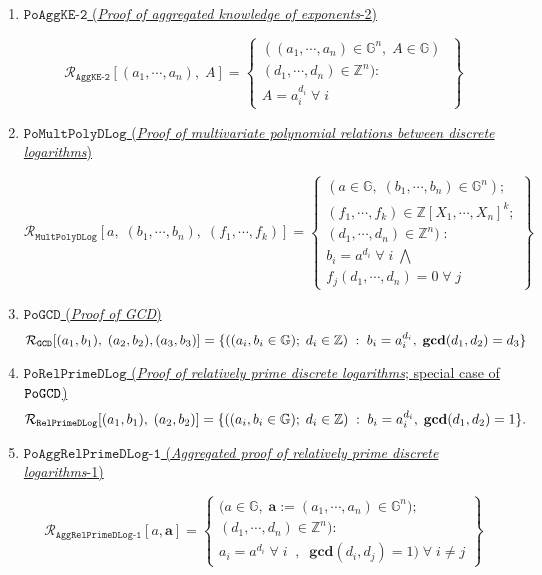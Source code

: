 \documentclass[11pt, lettersize, notitlepage, leqno, footskip=0.6cm]{article}
\newcommand{\bz}{\mathbb Z}
\newcommand{\ttt}{\texttt}
\newcommand{\mc}{\mathcal}
\newcommand{\mb}{\mathbb}
\newcommand{\mbf}{\mathbf}
\newcommand{\vs}{\vspace{-0.15cm}}
\newcommand{\GCD}{\mbf{gcd}}
\numberwithin{equation}{section}
\begin{document}
{{{\begin{enumerate}[wide, labelwidth=!, labelindent=0pt]
\item \hyperlink{AggKE-2}{$\ttt{PoAggKE-2}$ (\textit{Proof of aggregated knowledge of exponents}-2)} \vspace{-0.3cm}

\[
  \mc{R}_{{\ttt{AggKE-2}}}[(a_1,\cdots, a_n),\;A] = \left\{\begin{array}{l}
    ((a_1,\cdots, a_n)\in \mb{G}^n,\; A\in\mb{G})\;\\ 
    (d_1,\cdots,d_n)\in\bz^n) :  \\
     A = a_i^{d_i}\;\forall\;  i
  \end{array}\right\}
\]

\item \hyperlink{Mult}{$\ttt{PoMultPolyDLog}$ (\textit{Proof of multivariate polynomial relations between discrete logarithms})}\vspace{-0.6cm}

\[
  \mc{R}_{\ttt{MultPolyDLog}}[a,\; (b_1,\cdots, b_n),\; (f_1,\cdots,f_k)] = \left\{\begin{array}{l}
    (a\in\mb{G},\; (b_1,\cdots, b_n)\in\mb{G}^n);\\
    (f_1,\cdots,f_k)\in\bz[X_1,\cdots,X_n]^k;\\ 
    (d_1,\cdots,d_n)\in\bz^n)\;: \\
    b_i = a^{d_i}\;\forall\; i\;\bigwedge \;\\   f_j(d_1,\cdots,d_n) = 0\;\forall\; j 
  \end{array}\right\}
\]


\item \hyperlink{GCD}{$\ttt{PoGCD}$ (\textit{Proof of GCD})} \vspace{-0.15cm} $$\mc{R}_{{\ttt{GCD}}}[(a_1,b_1),\; (a_2,b_2),(a_3,b_3)] = \{((a_i, b_i\in\mb{G});\;d_i\in\bz)\;:\; b_i = a_i^{d_i},\;\GCD(d_1,d_2)=d_3  \} \vs $$


\item \hyperlink{RP}{$\ttt{PoRelPrimeDLog}$ (\textit{Proof of relatively prime discrete logarithms}; special case of $\tt{PoGCD}$)} \vs $$ \mc{R}_{\ttt{RelPrimeDLog}}[(a_1,b_1),\;(a_2,b_2)] = \{((a_i, b_i\in\mb{G});\;d_i\in\bz)\;:\; b_i = a_i^{d_i},\;\GCD(d_1,d_2)=1 \} . \vs $$


\item \hyperlink{RP1}{$\ttt{PoAggRelPrimeDLog-1}$ (\textit{Aggregated proof of relatively prime discrete logarithms}-1)} \vspace{-0.2cm}

\[
  \mc{R}_{\ttt{AggRelPrimeDLog-1}}[a, \mbf{a}] = \left\{\begin{array}{l}
    \big(a\in\mb{G},\;  \mbf{a}:=(a_1,\cdots, a_n)\in\mb{G}^n);\\
    (d_1,\cdots,d_n)\in\bz^n\big): \\
    a_i = a^{d_i}\;\forall\;i\;\;,\;\; \GCD(d_i, d_j) = 1)\;\forall \;i\neq j   	
  \end{array}\right\}
\] 


\end{enumerate}}}}
\end{document}
